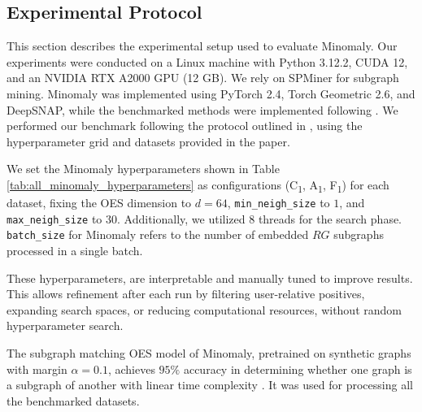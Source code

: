 \documentclass[pdflatex,sn-mathphys-num]{sn-jnl}%
\theoremstyle{thmstyleone}%
\theoremstyle{thmstyletwo}%
\theoremstyle{thmstylethree}%
\begin{document}
\subsection{Experimental Protocol}
This section describes the experimental setup used to evaluate Minomaly. Our experiments were conducted on a Linux machine with Python 3.12.2, CUDA 12, and an NVIDIA RTX A2000 GPU (12 GB). We rely on SPMiner \cite{ying2024representation} for subgraph mining. Minomaly was implemented using PyTorch 2.4, Torch Geometric 2.6, and DeepSNAP, while the benchmarked methods were implemented following \cite{JMLR:v25:23-0963}. We performed our benchmark following the protocol outlined in \cite{NEURIPS2022-acc1ec4a}, using the hyperparameter grid and datasets provided in the paper.

We set the Minomaly hyperparameters shown in Table \ref{tab:all_minomaly_hyperparameters} as configurations (C\textsubscript{1}, A\textsubscript{1}, F\textsubscript{1}) for each dataset, fixing the OES dimension to $d = 64$, \texttt{min\_neigh\_size} to $1$, and \texttt{max\_neigh\_size} to $30$. Additionally, we utilized $8$ threads for the search phase. \texttt{batch\_size} for Minomaly refers to the number of embedded $RG$ subgraphs processed in a single batch.

These hyperparameters, are interpretable and manually tuned to improve results. This allows refinement after each run by filtering user-relative positives, expanding search spaces, or reducing computational resources, without random hyperparameter search.

The subgraph matching OES model of Minomaly, pretrained on synthetic graphs with margin $\alpha = 0.1$, achieves \(95\%\) accuracy in determining whether one graph is a subgraph of another with linear time complexity \cite{ying2024representation}. It was used for processing all the benchmarked datasets.
\end{document}
